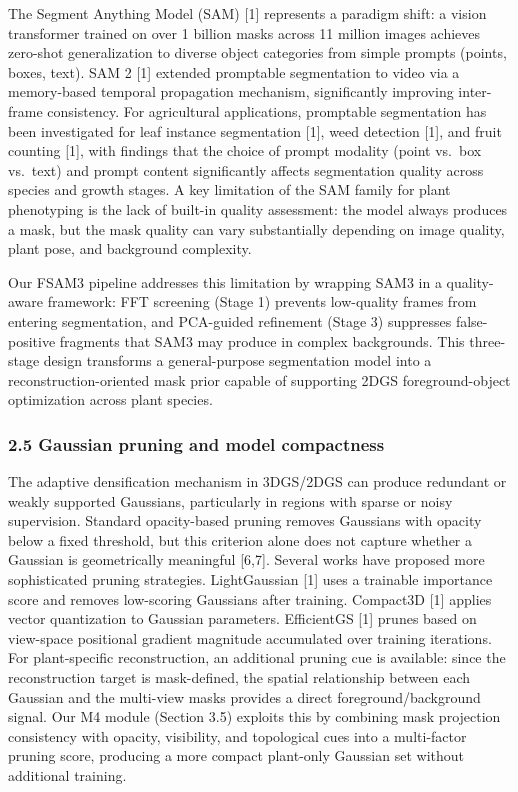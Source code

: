 \documentclass[11pt,a4paper]{article}
\begin{document}
The Segment Anything Model (SAM) {[}1{]} represents a paradigm shift: a
vision transformer trained on over 1 billion masks across 11 million
images achieves zero-shot generalization to diverse object categories
from simple prompts (points, boxes, text). SAM 2 {[}1{]} extended
promptable segmentation to video via a memory-based temporal propagation
mechanism, significantly improving inter-frame consistency. For
agricultural applications, promptable segmentation has been investigated
for leaf instance segmentation {[}1{]}, weed detection {[}1{]}, and
fruit counting {[}1{]}, with findings that the choice of prompt modality
(point vs.~box vs.~text) and prompt content significantly affects
segmentation quality across species and growth stages. A key limitation
of the SAM family for plant phenotyping is the lack of built-in quality
assessment: the model always produces a mask, but the mask quality can
vary substantially depending on image quality, plant pose, and
background complexity.

Our FSAM3 pipeline addresses this limitation by wrapping SAM3 in a
quality-aware framework: FFT screening (Stage 1) prevents low-quality
frames from entering segmentation, and PCA-guided refinement (Stage 3)
suppresses false-positive fragments that SAM3 may produce in complex
backgrounds. This three-stage design transforms a general-purpose
segmentation model into a reconstruction-oriented mask prior capable of
supporting 2DGS foreground-object optimization across plant species.

\subsubsection{2.5 Gaussian pruning and model
compactness}\label{gaussian-pruning-and-model-compactness}

The adaptive densification mechanism in 3DGS/2DGS can produce redundant
or weakly supported Gaussians, particularly in regions with sparse or
noisy supervision. Standard opacity-based pruning removes Gaussians with
opacity below a fixed threshold, but this criterion alone does not
capture whether a Gaussian is geometrically meaningful {[}6,7{]}.
Several works have proposed more sophisticated pruning strategies.
LightGaussian {[}1{]} uses a trainable importance score and removes
low-scoring Gaussians after training. Compact3D {[}1{]} applies vector
quantization to Gaussian parameters. EfficientGS {[}1{]} prunes based on
view-space positional gradient magnitude accumulated over training
iterations. For plant-specific reconstruction, an additional pruning cue
is available: since the reconstruction target is mask-defined, the
spatial relationship between each Gaussian and the multi-view masks
provides a direct foreground/background signal. Our M4 module (Section
3.5) exploits this by combining mask projection consistency with
opacity, visibility, and topological cues into a multi-factor pruning
score, producing a more compact plant-only Gaussian set without
additional training.
\end{document}
